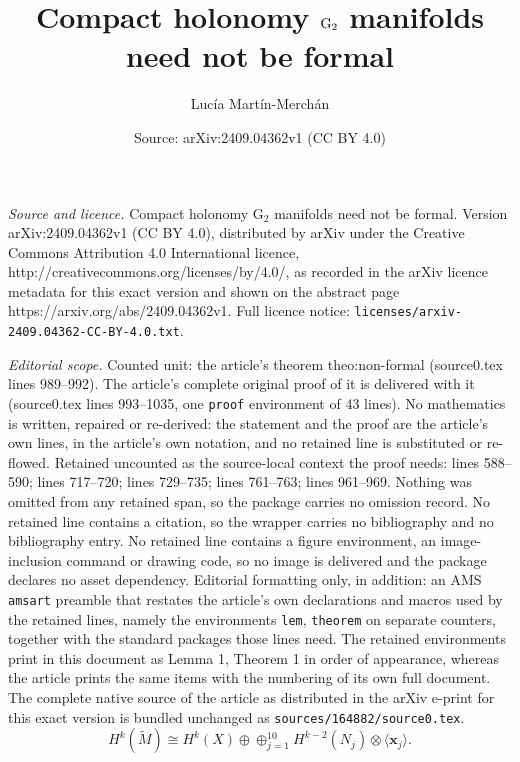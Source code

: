 \documentclass[10pt,a4paper]{amsart}
\title{Compact holonomy $\Gtwo$ manifolds need not be formal}
\author{Luc\'ia Mart\'in-Merch\'an}
\date{Source: arXiv:2409.04362v1 (CC BY 4.0)}
\newcommand{\Gtwo}{\mathrm{G}_2}
\newcommand{\la}{\langle}
\newcommand{\ra}{\rangle}
\begin{document}
\maketitle

\noindent\emph{Source and licence.} Compact holonomy $\Gtwo$ manifolds need not be formal. Version arXiv:2409.04362v1 (CC BY 4.0), distributed by arXiv under the Creative Commons Attribution 4.0 International licence, http://creativecommons.org/licenses/by/4.0/, as recorded in the arXiv licence metadata for this exact version and shown on the abstract page https://arxiv.org/abs/2409.04362v1. Full licence notice: \texttt{licenses/arxiv-2409.04362-CC-BY-4.0.txt}.\par\smallskip

\noindent\textit{Editorial scope.} Counted unit: the article's theorem theo:non-formal (source0.tex lines 989--992). The article's complete original proof of it is delivered with it (source0.tex lines 993--1035, one \texttt{proof} environment of 43 lines). No mathematics is written, repaired or re-derived: the statement and the proof are the article's own lines, in the article's own notation, and no retained line is substituted or re-flowed.  Retained uncounted as the source-local context the proof needs: lines 588--590; lines 717--720; lines 729--735; lines 761--763; lines 961--969.  Nothing was omitted from any retained span, so the package carries no omission record.  No retained line contains a citation, so the wrapper carries no bibliography and no bibliography entry.  No retained line contains a figure environment, an image-inclusion command or drawing code, so no image is delivered and the package declares no asset dependency.  Editorial formatting only, in addition: an AMS \texttt{amsart} preamble that restates the article's own declarations and macros used by the retained lines, namely the environments \texttt{lem}, \texttt{theorem} on separate counters, together with the standard packages those lines need.  The retained environments print in this document as Lemma 1, Theorem 1 in order of appearance, whereas the article prints the same items with the numbering of its own full document.  The complete native source of the article as distributed in the arXiv e-print for this exact version is bundled unchanged as \texttt{sources/164882/source0.tex}.
\begin{equation} \label{eqn:cohom}
H^k(\widetilde{M})\cong H^k(X)\oplus \oplus_{j=1}^{10} H^{k-2}(N_j)\otimes \la \mathbf{x}_j\ra.
\end{equation}
\end{document}
